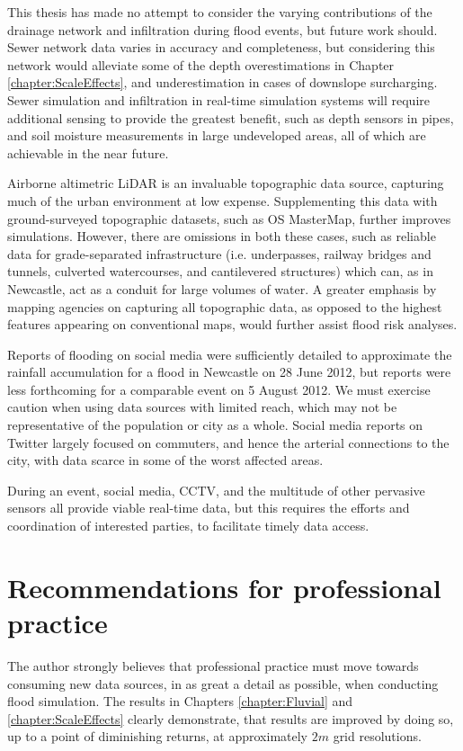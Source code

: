 This thesis has made no attempt to consider the varying contributions of the drainage network and infiltration during flood events, but future work should. Sewer network data varies in accuracy and completeness, but considering this network would alleviate some of the depth overestimations in Chapter \ref{chapter:ScaleEffects}, and underestimation in cases of downslope surcharging. Sewer simulation and infiltration in real-time simulation systems will require additional sensing to provide the greatest benefit, such as depth sensors in pipes, and soil moisture measurements in large undeveloped areas, all of which are achievable in the near future.

Airborne altimetric LiDAR is an invaluable topographic data source, capturing much of the urban environment at low expense. Supplementing this data with ground-surveyed topographic datasets, such as OS MasterMap, further improves simulations. However, there are omissions in both these cases, such as reliable data for grade-separated infrastructure (i.e. underpasses, railway bridges and tunnels, culverted watercourses, and cantilevered structures) which can, as in Newcastle, act as a conduit for large volumes of water. A greater emphasis by mapping agencies on capturing all topographic data, as opposed to the highest features appearing on conventional maps, would further assist flood risk analyses.

Reports of flooding on social media were sufficiently detailed to approximate the rainfall accumulation for a flood in Newcastle on 28 June 2012, but reports were less forthcoming for a comparable event on 5 August 2012. We must exercise caution when using data sources with limited reach, which may not be representative of the population or city as a whole. Social media reports on Twitter largely focused on commuters, and hence the arterial connections to the city, with data scarce in some of the worst affected areas.

During an event, social media, CCTV, and the multitude of other pervasive sensors all provide viable real-time data, but this requires the efforts and coordination of interested parties, to facilitate timely data access.

\section{Recommendations for professional practice}

The author strongly believes that professional practice must move towards consuming new data sources, in as great a detail as possible, when conducting flood simulation. The results in Chapters \ref{chapter:Fluvial} and \ref{chapter:ScaleEffects} clearly demonstrate, that results are improved by doing so, up to a point of diminishing returns, at approximately $2m$ grid resolutions.

